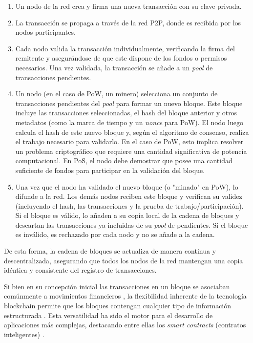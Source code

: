 \begin{enumerate}
    \item Un nodo de la red crea y firma una nueva transacción con su clave privada.
    \item La transacción se propaga a través de la red P2P, donde es recibida por los nodos participantes.
    \item Cada nodo valida la transacción individualmente, verificando la firma del remitente y asegurándose de que este dispone de los fondos o permisos necesarios. Una vez validada, la transacción se añade a un \textit{pool} de transacciones pendientes.
    \item Un nodo (en el caso de PoW, un minero) selecciona un conjunto de transacciones pendientes del \textit{pool} para formar un nuevo bloque. Este bloque incluye las transacciones seleccionadas, el hash del bloque anterior y otros metadatos (como la marca de tiempo y un \textit{nonce} para PoW). El nodo luego calcula el hash de este nuevo bloque y, según el algoritmo de consenso, realiza el trabajo necesario para validarlo. En el caso de PoW, esto implica resolver un problema criptográfico que requiere una cantidad significativa de potencia computacional. En PoS, el nodo debe demostrar que posee una cantidad suficiente de fondos para participar en la validación del bloque.
    \item Una vez que el nodo ha validado el nuevo bloque (o "minado" en PoW), lo difunde a la red. Los demás nodos reciben este bloque y verifican su validez (incluyendo el hash, las transacciones y la prueba de trabajo/participación). Si el bloque es válido, lo añaden a su copia local de la cadena de bloques y descartan las transacciones ya incluidas de su \textit{pool} de pendientes. Si el bloque es inválido, es rechazado por cada nodo y no se añade a la cadena.
\end{enumerate}

De esta forma, la cadena de bloques se actualiza de manera continua y descentralizada, asegurando que todos los nodos de la red mantengan una copia idéntica y consistente del registro de transacciones.

Si bien en su concepción inicial las transacciones en un bloque se asociaban comúnmente a movimientos financieros \cite{satoshi2008bitcoin}, la flexibilidad inherente de la tecnología blockchain permite que los bloques contengan cualquier tipo de información estructurada \cite{bartolomeo2020introduccion}. Esta versatilidad ha sido el motor para el desarrollo de aplicaciones más complejas, destacando entre ellas los \textit{smart contracts} (contratos inteligentes) \cite{sunny2022systematic}.


